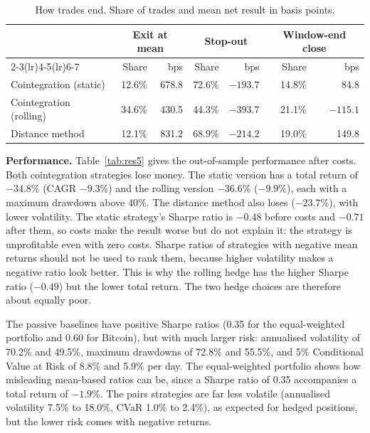 \documentclass[10pt,a4paper,twocolumn]{article}
\begin{document}
\begin{table}[htbp]
	\centering
	\small
	\caption{How trades end. Share of trades and mean net result in basis points.}
	\label{tab:res7}
	\begin{tabular}{@{}lrrrrrr@{}}
		\toprule
		& \multicolumn{2}{c}{Exit at mean} & \multicolumn{2}{c}{Stop-out} & \multicolumn{2}{c}{Window-end close} \\
		\cmidrule(lr){2-3}\cmidrule(lr){4-5}\cmidrule(lr){6-7}
		& Share & bps & Share & bps & Share & bps \\
		\midrule
		Cointegration (static) & 12.6\% & 678.8 & 72.6\% & $-193.7$ & 14.8\% & 84.8 \\
		Cointegration (rolling) & 34.6\% & 430.5 & 44.3\% & $-393.7$ & 21.1\% & $-115.1$ \\
		Distance method & 12.1\% & 831.2 & 68.9\% & $-214.2$ & 19.0\% & 149.8 \\
		\bottomrule
	\end{tabular}
\end{table}

\textbf{Performance.} Table~\ref{tab:res5} gives the out-of-sample performance after costs. Both cointegration strategies lose money. The static version has a total return of $-34.8\%$ (CAGR $-9.3\%$) and the rolling version $-36.6\%$ ($-9.9\%$), each with a maximum drawdown above 40\%. The distance method also loses ($-23.7\%$), with lower volatility. The static strategy's Sharpe ratio is $-0.48$ before costs and $-0.71$ after them, so costs make the result worse but do not explain it: the strategy is unprofitable even with zero costs. Sharpe ratios of strategies with negative mean returns should not be used to rank them, because higher volatility makes a negative ratio look better. This is why the rolling hedge has the higher Sharpe ratio ($-0.49$) but the lower total return. The two hedge choices are therefore about equally poor.

The passive baselines have positive Sharpe ratios (0.35 for the equal-weighted portfolio and 0.60 for Bitcoin), but with much larger risk: annualised volatility of 70.2\% and 49.5\%, maximum drawdowns of 72.8\% and 55.5\%, and 5\% Conditional Value at Risk of 8.8\% and 5.9\% per day. The equal-weighted portfolio shows how misleading mean-based ratios can be, since a Sharpe ratio of 0.35 accompanies a total return of $-1.9\%$. The pairs strategies are far less volatile (annualised volatility 7.5\% to 18.0\%, CVaR 1.0\% to 2.4\%), as expected for hedged positions, but the lower risk comes with negative returns.
\end{document}
